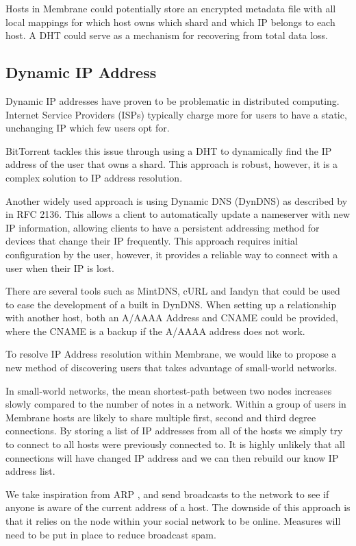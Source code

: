 \documentclass[11pt, a4paper, twocolumn, twoside]{report}
\begin{document}
Hosts in Membrane could potentially store an encrypted metadata file with all local mappings for which host owns which shard and which IP belongs to each host. A DHT could serve as a mechanism for recovering from total data loss.

\subsection{Dynamic IP Address}

Dynamic IP addresses have proven to be problematic in distributed computing. Internet Service Providers (ISPs) typically charge more for users to have a static, unchanging IP which few users opt for.

BitTorrent tackles this issue through using a DHT to dynamically find the IP address of the user that owns a shard. This approach is robust, however, it is a complex solution to IP address resolution.

Another widely used approach is using Dynamic DNS (DynDNS) as described by \cite{bound1997dynamic} in RFC 2136. This allows a client to automatically update a nameserver with new IP information, allowing clients to have a persistent addressing method for devices that change their IP frequently. This approach requires initial configuration by the user, however, it provides a reliable way to connect with a user when their IP is lost.

There are several tools such as MintDNS, cURL and Iandyn that could be used to ease the development of a built in DynDNS. When setting up a relationship with another host, both an A/AAAA Address and CNAME could be provided, where the CNAME is a backup if the A/AAAA address does not work.

To resolve IP Address resolution within Membrane, we would like to propose a new method of discovering users that takes advantage of small-world networks. \citep{porter2012small}

In small-world networks, the mean shortest-path between two nodes increases slowly compared to the number of notes in a network. Within a group of users in Membrane hosts are likely to share multiple first, second and third degree connections. By storing a list of IP addresses from all of the hosts we simply try to connect to all hosts were previously connected to. It is highly unlikely that all connections will have changed IP address and we can then rebuild our know IP address list.

We take inspiration from ARP \citep{plummer1982ethernet}, and send broadcasts to the network to see if anyone is aware of the current address of a host. The downside of this approach is that it relies on the node within your social network to be online. Measures will need to be put in place to reduce broadcast spam.
\end{document}
